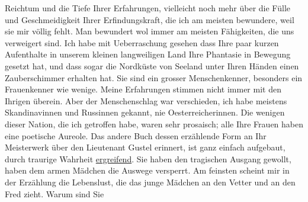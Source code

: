 \begin{ledgroupsized}[t]{13cm}
                    Reichtum und die Tiefe Ihrer Erfahrungen, vielleicht noch mehr über die Fülle
                    und Geschmeidigkeit Ihrer Erfindungskraft, die ich am meisten bewundere, weil
                    sie mir völlig fehlt. Man bewundert {\pb}wol immer am meisten
                    Fähigkeiten, die uns verweigert sind.\pend
           \pstart
           Ich habe mit Ueberraschung gesehen dass Ihre paar kurzen Aufenthalte in unserem
                    kleinen langweiligen Land
                    Ihre Phantasie in Bewegung gesetzt hat, und dass sogar die Nordküste von Seeland unter Ihren Händen einen Zauberschimmer erhalten hat.\pend
           \pstart
           Sie sind ein grosser Menschenkenner, besonders ein Frauenkenner wie wenige. Meine
                    Erfahrungen stimmen nicht immer mit den Ihrigen überein. Aber der Menschenschlag
                    war verschieden, ich habe meistens Skandinavinnen und Russinnen
                    gekannt, nie Oesterreicherinnen. Die wenigen
                    dieser Nation, die ich getroffen habe, waren sehr prosaisch; alle Ihre Frauen
                    haben eine poetische Aureole.\pend
           \pstart
           Das andere Buch dessen
                    erzählende Form an Ihr Meisterwerk über den {\pb}Lieutenant Gustel erinnert, ist ganz einfach
                    aufgebaut, durch traurige Wahrheit \uline{ergreifend}.
                    Sie haben den tragischen Ausgang gewollt, haben dem armen Mädchen die Auswege
                    versperrt. Am feinsten scheint mir in der Erzählung die Lebenslust, die das
                    junge Mädchen an den Vetter und an den Fred zieht. Warum sind Sie

\end{ledgroupsized}

